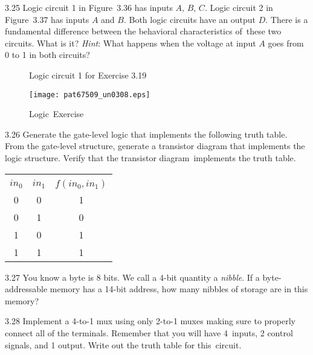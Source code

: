 \documentclass{patt}
\begin{document}
\begin{exercises}
\item[3.25] Logic circuit 1 in Figure~3.36 has inputs $A$, $B$, $C$.
  Logic circuit 2 in Figure~3.37 has inputs $A$ and $B$. Both logic
  circuits have an output $D$. There is a fundamental difference between
  the behavioral characteristics of~these two circuits. What is it?
  {\em Hint}: What happens when the voltage\break
  at input $A$ goes from 0 to 1 in both circuits?

\begin{figure}[h]
\setlength{\multifigspace}{3pc}
{\caption{Logic circuit 1 for Exercise 3.19}}
{\texttt{[image: pat67509\_un0308.eps]}}
{\caption{Logic~\break Exercise~}}
\end{figure}

\newpage

\item[3.26] Generate the gate-level logic that implements the
  following truth table. From the gate-level structure, generate a
  transistor diagram that implements the logic structure. Verify that
  the transistor diagram~implements the truth table.

\begin{inlinetable}
\vspace{-3pt}
\tabcolsep=12pt
\begin{tabular}{@{}cc|c@{}} \hline\\[-9.9pt]
\rule{0pt}{10pt}${in_{0}}$\rule{0pt}{10pt}
& ${in_{1}}$ & $f(in_{0}, in_{1})$ \\\hline
\rule{0pt}{10pt}0\rule{0pt}{10pt} & 0 & 1 \\[2.6pt]
0 & 1 & 0 \\[2.6pt]
1 & 0 & 1 \\[2.6pt]
1 & 1 & 1 \\\hline
\end{tabular}
\vspace{-6pt}
\end{inlinetable}

\item[3.27] You know a byte is 8 bits. We call a 4-bit quantity a
  {\em nibble}. If a byte-addressable memory has a 14-bit address, how
  many nibbles of storage are in this memory?

\item[3.28] Implement a 4-to-1 mux using only 2-to-1 muxes making sure
  to properly connect all of the terminals. Remember that you will
  have 4~inputs, 2 control signals, and 1 output. Write out the
  truth table for this~circuit.


\end{exercises}
\end{document}
